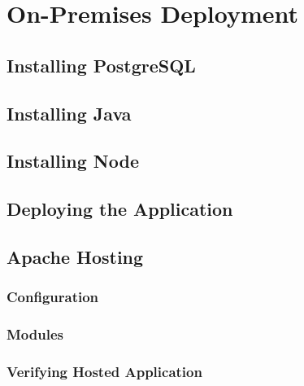 \section{On-Premises Deployment}

\subsection{Installing PostgreSQL}
\subsection{Installing Java}
\subsection{Installing Node}
\subsection{Deploying the Application}
\subsection{Apache Hosting}
\subsubsection{Configuration}
\subsubsection{Modules}
\subsubsection{Verifying Hosted Application}